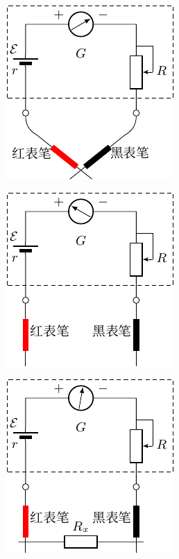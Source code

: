 \begin{figure}[htbp]
	\centering
	\begin{subfigure}{0.3\linewidth}
		\centering
		\includegraphics{fig/B/7-38a.pdf}
		\caption{}\label{fig_B_7-38a}
	\end{subfigure}
	\hfil
	\begin{subfigure}{0.3\linewidth}
		\centering
		\includegraphics{fig/B/7-38b.pdf}
		\caption{}\label{fig_B_7-38b}
	\end{subfigure}
	\hfil
	\begin{subfigure}{0.3\linewidth}
		\centering
		\includegraphics{fig/B/7-38c.pdf}
		\caption{}\label{fig_B_7-38c}
	\end{subfigure}
	\caption{}\label{fig_B_7-38}
\end{figure}




